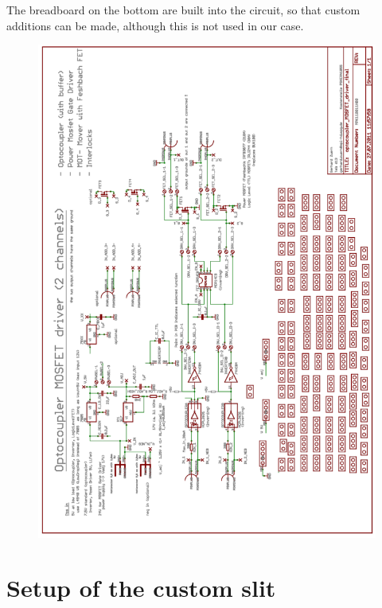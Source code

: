 The breadboard on the bottom are built into the circuit, so that custom additions can be made, although this is not used in our case.


\begin{figure}[htb]
	\begin{center}
		\includegraphics[width=\textwidth]{drafts/shutter_circuit.pdf}
	\end{center}
\end{figure}

\chapter{Setup of the custom slit}


